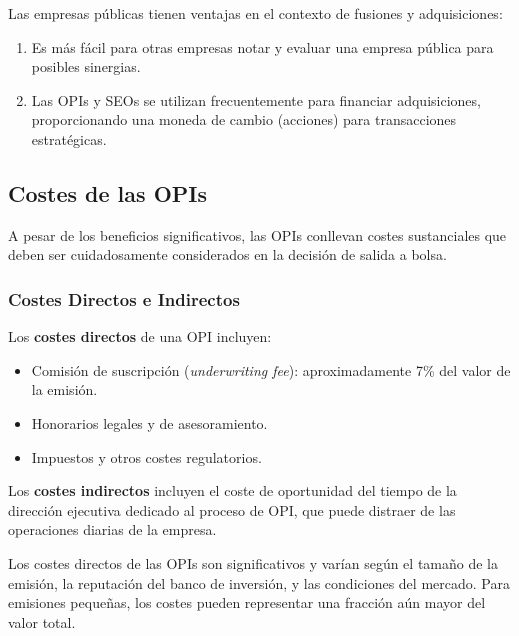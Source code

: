 Las empresas públicas tienen ventajas en el contexto de fusiones y adquisiciones:

\begin{enumerate}
\item Es más fácil para otras empresas notar y evaluar una empresa pública para posibles sinergias.
\item Las OPIs y SEOs se utilizan frecuentemente para financiar adquisiciones, proporcionando una moneda de cambio (acciones) para transacciones estratégicas.
\end{enumerate}

\subsection{Costes de las OPIs}

A pesar de los beneficios significativos, las OPIs conllevan costes sustanciales que deben ser cuidadosamente considerados en la decisión de salida a bolsa.

\subsubsection{Costes Directos e Indirectos}

\begin{definicion}
Los \textbf{costes directos} de una OPI incluyen:
\begin{itemize}
\item Comisión de suscripción (\textit{underwriting fee}): aproximadamente 7\% del valor de la emisión.
\item Honorarios legales y de asesoramiento.
\item Impuestos y otros costes regulatorios.
\end{itemize}
\end{definicion}

\begin{definicion}
Los \textbf{costes indirectos} incluyen el coste de oportunidad del tiempo de la dirección ejecutiva dedicado al proceso de OPI, que puede distraer de las operaciones diarias de la empresa.
\end{definicion}

Los costes directos de las OPIs son significativos y varían según el tamaño de la emisión, la reputación del banco de inversión, y las condiciones del mercado. Para emisiones pequeñas, los costes pueden representar una fracción aún mayor del valor total.

